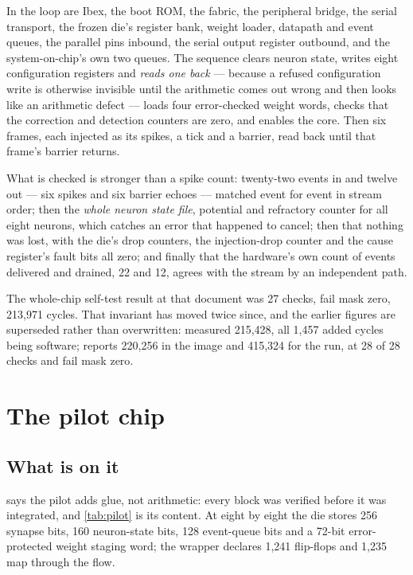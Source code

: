In the loop are Ibex, the boot ROM, the fabric, the peripheral bridge,
the serial transport, the frozen die's register bank, weight loader,
datapath and event queues, the parallel pins inbound, the serial output
register outbound, and the system-on-chip's own two queues. The
sequence clears neuron state, writes eight configuration registers and
\emph{reads one back} --- because a refused configuration write is
otherwise invisible until the arithmetic comes out wrong and then looks
like an arithmetic defect --- loads four error-checked weight words,
checks that the correction and detection counters are zero, and enables
the core. Then six frames, each injected as its spikes, a tick and a
barrier, read back until that frame's barrier returns.

What is checked is stronger than a spike count: twenty-two events in
and twelve out --- six spikes and six barrier echoes --- matched event
for event in stream order; then the \emph{whole neuron state file},
potential and refractory counter for all eight neurons, which catches
an error that happened to cancel; then that nothing was lost, with the
die's drop counters, the injection-drop counter and the cause
register's fault bits all zero; and finally that the hardware's own
count of events delivered and drained, 22 and 12, agrees with the
stream by an independent path.

The whole-chip self-test result at that document was 27 checks, fail
mask zero, 213,971 cycles. That invariant has moved twice since, and
the earlier figures are superseded rather than overwritten:
 measured 215,428, all 1,457 added cycles being software;
 reports 220,256 in the image and 415,324 for the run, at
28 of 28 checks and fail mask zero.

\section{The pilot chip}

\subsection{What is on it}

 says the pilot adds glue, not arithmetic: every
block was verified before it was integrated, and \cref{tab:pilot} is
its content. At eight by eight the die stores 256 synapse bits, 160
neuron-state bits, 128 event-queue bits and a 72-bit error-protected
weight staging word; the wrapper declares 1,241 flip-flops and 1,235
map through the flow.

